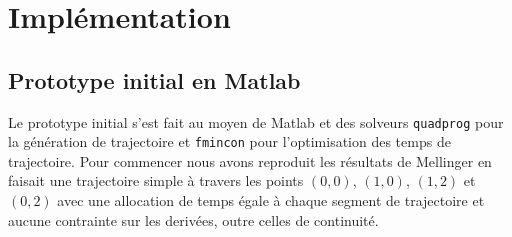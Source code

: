 \section{Implémentation}
\subsection{Prototype initial en Matlab}

Le prototype initial s'est fait au moyen de Matlab et des solveurs \texttt{quadprog} pour la génération de trajectoire et \texttt{fmincon} pour l'optimisation des temps de trajectoire. Pour commencer nous avons reproduit les résultats de Mellinger en faisait une trajectoire simple à travers les points $(0,0)$, $(1,0)$, $(1,2)$ et $(0,2)$ avec une allocation de temps égale à chaque segment de trajectoire et aucune contrainte sur les derivées, outre celles de continuité.

